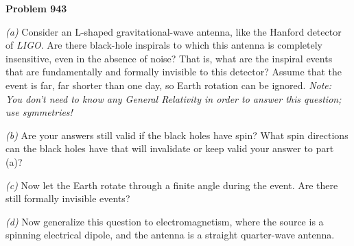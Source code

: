 \documentclass[12pt]{article}
\begin{document}
\pagecolor{advancedcolor}\begin{pottproblem}
\textbf{Problem 943}

\textsl{(a)}
Consider an L-shaped gravitational-wave antenna, like the Hanford detector
of \textsl{LIGO}.
Are there black-hole inspirals to which this antenna is completely insensitive,
even in the absence of noise?
That is, what are the inspiral events that are fundamentally and formally invisible to this
detector?
Assume that the event is far, far shorter than one day, so Earth rotation can be ignored.
\emph{Note: You don't need to know any General Relativity in order to answer this question; use symmetries!}

\textsl{(b)}
Are your answers still valid if the black holes have spin?
What spin directions can the black holes have that will invalidate
or keep valid your answer to part (a)?

\textsl{(c)}
Now let the Earth rotate through a finite angle during the event.
Are there still formally invisible events?

\textsl{(d)}
Now generalize this question to electromagnetism, where the source is a 
spinning electrical dipole, and the antenna is a straight quarter-wave antenna.

\end{pottproblem}
\end{document}
